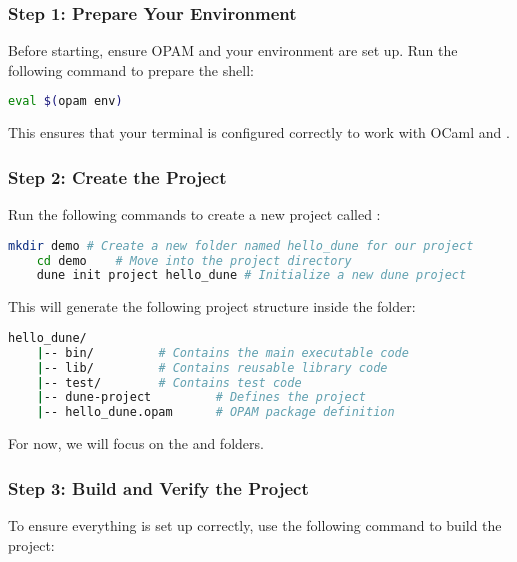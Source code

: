\subsubsection{Step 1: Prepare Your Environment}

Before starting, ensure OPAM and your environment are set up. Run the following command to prepare the shell:

\begin{lstlisting}[language=Bash, caption={Preparing Your OPAM Environment}]
    eval $(opam env)
\end{lstlisting}

\noindent
This ensures that your terminal is configured correctly to work with OCaml and .

\subsubsection{Step 2: Create the Project}

\noindent
Run the following commands to create a new  project called :

\begin{lstlisting}[language=Bash, caption={Creating the Project}]
    mkdir demo # Create a new folder named hello_dune for our project
    cd demo    # Move into the project directory
    dune init project hello_dune # Initialize a new dune project
\end{lstlisting}

\noindent
This will generate the following project structure inside the  folder:
\begin{lstlisting}[language=Bash, caption={Generated Project Structure}]
    hello_dune/
    |-- bin/         # Contains the main executable code
    |-- lib/         # Contains reusable library code
    |-- test/        # Contains test code
    |-- dune-project         # Defines the project
    |-- hello_dune.opam      # OPAM package definition
\end{lstlisting}

\noindent
For now, we will focus on the  and  folders.

\subsubsection{Step 3: Build and Verify the Project}

To ensure everything is set up correctly, use the following command to build the project:

